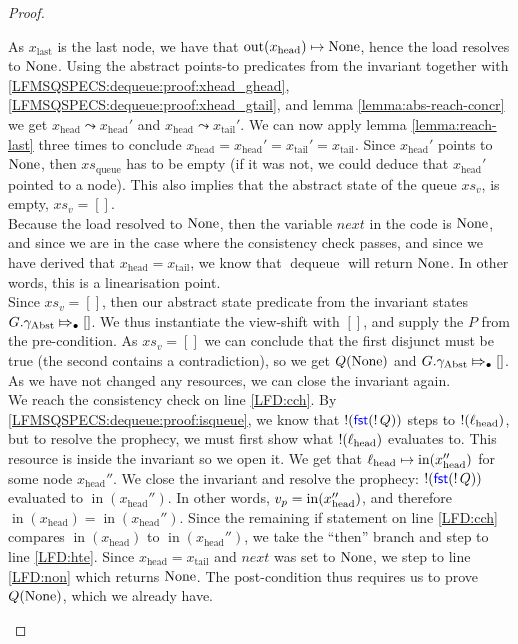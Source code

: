 \documentclass[a4paper, 10pt]{report}
\theoremstyle{definition}
\newcommand{\dequeue}{\operatorname{dequeue}}
\newcommand{\xsqueue}{xs_{\mathrm{queue}}}
\newcommand{\locN}[1]{\loc_{\mathrm{#1}}}
\newcommand{\lochead}{\locN{head}}
\newcommand{\nIn}[1]{\operatorname{in}(#1)}
\newcommand{\nOut}[1]{\operatorname{out}(#1)}
\newcommand{\node}{x}
\newcommand{\nodeN}[1]{\node_{\mathrm{#1}}}
\newcommand{\nodehead}{\nodeN{head}}
\newcommand{\nodetail}{\nodeN{tail}}
\newcommand{\nodelast}{\nodeN{last}}
\newcommand{\absvalueList}{xs_v}
\newcommand{\prophval}{\val_p}
\newcommand{\Qg}{G}
\newcommand{\gabst}{\gname_{\mathrm{Abst}}}
\newcommand{\abstractstateauth}[2]{#1 \Mapsto_{\bullet} #2}
\newcommand{\reach}[2]{#1 \leadsto #2}
\begin{document}
\begin{proof}
\begin{itemize}
\begin{itemize}
      As $\nodelast$ is the last node, we have that $\nOut{\nodehead} \mapsto \None$, hence the load resolves to $\operatorname{None}$. Using the abstract points-to predicates from the invariant together with \ref{LFMSQSPECS:dequeue:proof:xhead_ghead}, \ref{LFMSQSPECS:dequeue:proof:xhead_gtail}, and lemma \ref{lemma:abs-reach-concr} we get $\reach{\nodehead}{\nodehead'}$ and $\reach{\nodehead}{\nodetail'}$. We can now apply lemma \ref{lemma:reach-last} three times to conclude $\nodehead = \nodehead' = \nodetail' = \nodetail$. Since $\nodehead'$ points to $\operatorname{None}$, then $\xsqueue$ has to be empty (if it was not, we could deduce that $\nodehead'$ pointed to a node). This also implies that the abstract state of the queue $\absvalueList$, is empty, $\absvalueList = []$.\\
      Because the load resolved to $\operatorname{None}$, then the variable $next$ in the code is $\operatorname{None}$, and since we are in the case where the consistency check passes, and since we have derived that $\nodehead = \nodetail$, we know that $\dequeue$ will return $\operatorname{None}$. In other words, this is a linearisation point.\\
      Since $\absvalueList = []$, then our abstract state predicate from the invariant states $\abstractstateauth{\Qg.\gabst}{[]}$. We thus instantiate the view-shift with $[]$, and supply the $P$ from the pre-condition. As $\absvalueList = []$ we can conclude that the first disjunct must be true (the second contains a contradiction), so we get $Q(\operatorname{None})$ and $\abstractstateauth{\Qg.\gabst}{[]}$. As we have not changed any resources, we can close the invariant again.\\
      We reach the consistency check on line \ref{LFD:cch}. By \ref{LFMSQSPECS:dequeue:proof:isqueue}, we know that $\mathop{!}(\operatorname{\textsf{\color{blue} fst}} (\mathop{!} Q))$ steps to $\deref(\lochead)$, but to resolve the prophecy, we must first show what $\deref(\lochead)$ evaluates to. This resource is inside the invariant so we open it. We get that $\lochead \mapsto \nIn{\nodehead''}$ for some node $\nodehead''$. We close the invariant and resolve the prophecy: $\mathop{!}(\operatorname{\textsf{\color{blue} fst}} (\mathop{!} Q))$ evaluated to $\nIn{\nodehead''}$. In other words, $\prophval = \nIn{\nodehead''}$, and therefore $\nIn{\nodehead} = \nIn{\nodehead''}$. Since the remaining if statement on line \ref{LFD:cch} compares $\nIn{\nodehead}$ to $\nIn{\nodehead''}$, we take the ``then'' branch and step to line \ref{LFD:hte}. Since $\nodehead = \nodetail$ and $next$ was set to $\operatorname{None}$, we step to line \ref{LFD:non} which returns $\operatorname{None}$. The post-condition thus requires us to prove $Q(\operatorname{None})$, which we already have.


\end{itemize}
\end{itemize}
\end{proof}
\end{document}
